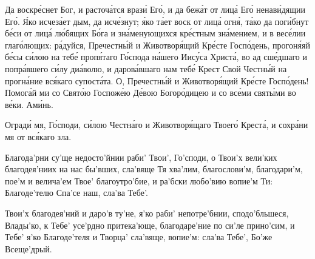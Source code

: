 \begin{mymulticols}



Да воскр\'{е}снет Бог, и расточ\'{а}тся враз\'{и} Ег\'{о}, и да беж\'{а}т от лиц\'{а} Ег\'{о} ненав\'{и}дящии Ег\'{о}. \'{Я}ко исчез\'{а}ет дым, да исч\'{е}знут; \'{я}ко т\'{а}ет воск от лиц\'{а} огн\'{я}, т\'{а}ко да пог\'{и}бнут б\'{е}си от лиц\'{а} л\'{ю}бящих Б\'{о}га и зн\'{а}менующихся кр\'{е}стным зн\'{а}мением, и в вес\'{е}лии глаг\'{о}лющих: р\'{а}дуйся, Пречестн\'{ы}й и Животвор\'{я}щий Кр\'{е}сте Госп\'{о}день, прогон\'{я}яй б\'{е}сы с\'{и}лою на теб\'{е} проп\'{я}таго Г\'{о}спода н\'{а}шего Иис\'{у}са Христ\'{а}, во ад сш\'{е}дшаго и попр\'{а}вшего с\'{и}лу ди\'{а}волю, и даров\'{а}вшаго нам теб\'{е} Крест Свой Честн\'{ы}й на прогн\'{а}ние вс\'{я}каго супост\'{а}та. О, Пречестн\'{ы}й и Животвор\'{я}щий Кр\'{е}сте Госп\'{о}день! Помог\'{а}й ми со Свят\'{о}ю Госпож\'{е}ю Д\'{е}вою Богор\'{о}дицею и со вс\'{е}ми свят\'{ы}ми во в\'{е}ки. Ам\'{и}нь.


Оград\'{и} мя, Г\'{о}споди, с\'{и}лою Честн\'{а}го и Животвор\'{я}щаго Твоег\'{о} Крест\'{а}, и сохр\'{а}ни мя от вс\'{я}каго зла.

\end{mymulticols}

\mychapterending

\begin{mymulticols}



Благода'рни су'ще недосто'йнии раби' Твои', Го'споди, о Твои'х вели'ких благодея'ниих на нас бы'вших, сла'вяще Тя хва'лим, благослови'м, благодари'м, пое'м и велича'ем Твое' благоутро'бие, и ра'бски любо'вию вопие'м Ти: Благоде'телю Спа'се наш, сла'ва Тебе'.


Твои'х благодея'ний и даро'в ту'не, я'ко раби' непотре'бнии, сподо'бльшеся, Влады'ко, к Тебе' усе'рдно притека'юще, благодаре'ние по си'ле прино'сим, и Тебе' я'ко Благоде'теля и Творца' сла'вяще, вопие'м: сла'ва Тебе', Бо'же Всеще'дрый.

\slavainynen


\end{mymulticols}

